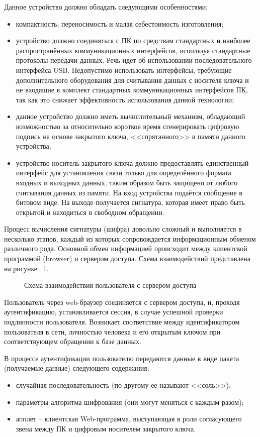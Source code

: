Данное устройство должно обладать следующими особенностями:
\begin{itemize}
  \item компактность, переносимость и малая себестоимость
изготовления;
\item устройство должно соединяться с ПК по средствам стандартных и наиболее
распространённых коммуникационных интерфейсов, используя стандартные протоколы
передачи данных. Речь идёт об использовании последовательного интерфейса USB. 
Недопустимо использовать интерфейсы, требующие дополнительного оборудования для
считывания данных с носителя ключа и не входящие в комплект стандартных
коммуникационных интерфейсов ПК, так как это снижает эффективность использования
данной технологии;
\item данное устройство должно иметь вычислительный механизм,
обладающий возможностью за относительно короткое время сгенерировать цифровую
подпись на основе закрытого ключа, <<спрятанного>> в памяти данного
устройства;
\item устройство-носитель закрытого ключа должно предоставлять единственный
интерфейс для установления связи только для определённого формата входных и
выходных данных, таким образом быть защищено от любого считывания данных из
памяти. На вход устройства подаётся сообщение в битовом виде. На выходе
получается сигнатура, которая имеет право быть
открытой и находиться в свободном обращении.
\end{itemize}  

Процесс вычисления сигнатуры (шифра) довольно сложный и выполняется в несколько
этапов, каждый из которых сопровождается информационным обменом различного рода.
Основной обмен информацией происходит между клиентской программой
(browser) и сервером доступа. Схема взаимодействий представлена на рисунке
~\ref{ris:3.1.3}.

\begin{figure}[h!]
\center{\texttt{[image: 3-1-3]}}
\caption{Схема взаимодействия пользователя с сервером доступа}
\label{ris:3.1.3}
\end{figure} 
 
Пользователь через web-браузер соединяется с сервером доступа, и,
проходя аутентификацию, устанавливается сессия, в случае успешной проверки
подлинности пользователя. Возникает соответствие между идентификатором
пользователя в сети, личностью человека и его открытым ключом при
соответствующем обращении к базе данных.

В процессе аутентификации пользователю передаются данные в виде пакета
(получаемые данные) следующего содержания:
\begin{itemize}
  \item случайная последовательность (по другому ее называют <<соль>>);
  \item параметры алгоритма шифрования (они могут меняться с каждым разом);
  \item апплет – клиентская Web-программа, выступающая в роли согласующего звена
  между ПК и цифровым носителем закрытого ключа.
\end{itemize}

